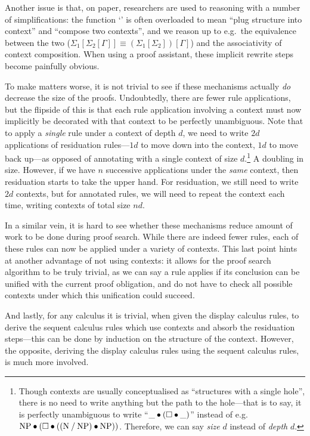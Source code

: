 Another issue is that, on paper, researchers are used to reasoning
with a number of simplifications: the function `\plug' is often
overloaded to mean ``plug structure into context'' and ``compose two
contexts'', and we reason up to e.g.\ the equivalence between the two
($\Sigma_1[\Sigma_2[\Gamma]]\equiv (\Sigma_1[\Sigma_2])[\Gamma]$) and
the associativity of context composition. When using a proof
assistant, these implicit rewrite steps become painfully obvious.

To make matters worse, it is not trivial to see if these mechanisms
actually \emph{do} decrease the size of the proofs. Undoubtedly, there
are fewer rule applications, but the flipside of this is that each
rule application involving a context must now implicitly be decorated
with that context to be perfectly unambiguous.
Note that to apply a \emph{single} rule under a context of depth $d$,
we need to write $2d$ applications of residuation rules---$1d$ to move
down into the context, $1d$ to move back up---as opposed of annotating
with a single context of size $d$.\footnote{%
  Though contexts are usually conceptualised as ``structures with a
  single hole'', there is no need to write anything but the path to
  the hole---that is to say, it is perfectly unambiguous to write
  ``$\_\bullet(\square\bullet\_)$'' instead of e.g.\
  $\text{NP}\bullet(\square\bullet((\text{N}\mathbin{\slash}\text{NP})\bullet\text{NP}))$. Therefore, we can
  say \emph{size} $d$ instead of \emph{depth} $d$.
}
A doubling in size. However, if we have $n$ successive applications
under the \emph{same} context, then residuation starts to take the
upper hand. For residuation, we still need to write $2d$ contexts, but
for annotated rules, we will need to repeat the context each time,
writing contexts of total size $nd$.

In a similar vein, it is hard to see whether these mechanisms reduce
amount of work to be done during proof search. While there are indeed
fewer rules, each of these rules can now be applied under a variety of
contexts.
This last point hints at another advantage of not using contexts: it
allows for the proof search algorithm to be truly trivial, as we can
say a rule applies if its conclusion can be unified with the current
proof obligation, and do not have to check all possible contexts under
which this unification could succeed.

And lastly, for any calculus it is trivial, when given the display
calculus rules, to derive the sequent calculus rules which use
contexts and absorb the residuation steps---this can be done by
induction on the structure of the context. However, the opposite,
deriving the display calculus rules using the sequent calculus rules,
is much more involved.



